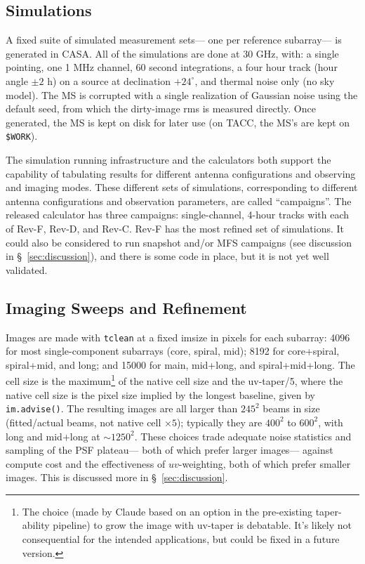 \documentclass[11pt]{article}
\begin{document}
\subsection{Simulations}
\label{sec:sims}

A fixed suite of simulated measurement sets--- one per reference
subarray--- is generated in CASA.  All of the simulations are done at
30 GHz, with: a single pointing, one 1 MHz channel, 60 second
integrations, a four hour track (hour angle $\pm 2$ h) on a source at
declination $+24^\circ$, and thermal noise only (no sky model).  The
MS is corrupted with a single realization of Gaussian noise using the
default seed, from which the dirty-image rms is measured
directly. Once generated, the MS is kept on disk for later
use (on TACC, the MS's are kept on {\tt \$WORK}).

The simulation running infrastructure and the calculators both support
the capability of tabulating results for different antenna
configurations and observing and imaging modes. These different sets
of simulations, corresponding to different antenna configurations and
observation parameters, are called ``campaigns''.  The released
calculator has three campaigns: single-channel, 4-hour tracks with
each of Rev-F, Rev-D, and Rev-C. Rev-F has the most refined set of
simulations. It could also be considered to run snapshot and/or MFS
campaigns (see discussion in \S~\ref{sec:discussion}), and there is
some code in place, but it is not yet well validated.

\subsection{Imaging Sweeps and Refinement}
\label{sec:img}

Images are made with {\tt tclean} at a fixed imsize in pixels for each
subarray: 4096 for most single-component subarrays (core, spiral,
mid); 8192 for core+spiral, spiral+mid, and long; and 15000 for main,
mid+long, and spiral+mid+long. The cell size is the
maximum\footnote{The choice (made by Claude based on an option in the
pre-existing taper-ability pipeline) to grow the image with uv-taper
is debatable. It's likely not consequential for the intended
applications, but could be fixed in a future version.} of the native
cell size and the uv-taper/5, where the native cell size is the pixel
size implied by the longest baseline, given by {\tt im.advise()}. The
resulting images are all larger than $245^2$ beams in size
(fitted/actual beams, not native cell $\times 5$); typically they are
$400^2$ to $600^2$, with long and mid+long at $\sim 1250^2$.  These
choices trade adequate noise statistics and sampling of the PSF
plateau--- both of which prefer larger images--- against compute
cost and the effectiveness of $uv$-weighting, both of which prefer
smaller images. This is discussed more in \S~\ref{sec:discussion}.
\end{document}

